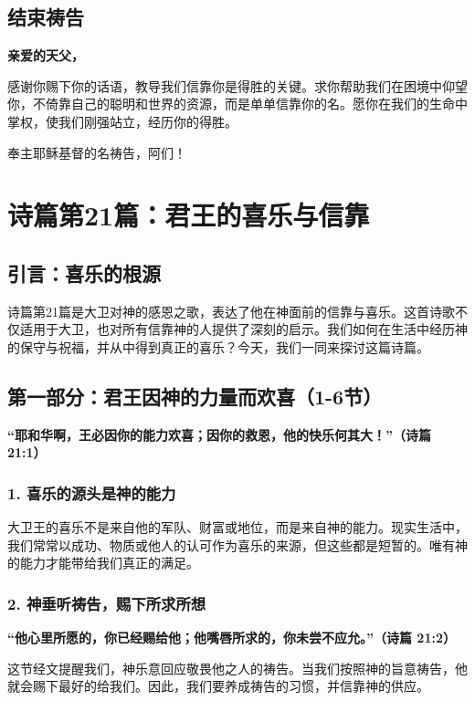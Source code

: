 \documentclass[a4paper, 12pt]{article}
\begin{document}
\subsection*{结束祷告}

\textbf{亲爱的天父，}

感谢你赐下你的话语，教导我们信靠你是得胜的关键。求你帮助我们在困境中仰望你，不倚靠自己的聪明和世界的资源，而是单单信靠你的名。愿你在我们的生命中掌权，使我们刚强站立，经历你的得胜。

奉主耶稣基督的名祷告，阿们！
\newpage
\section{诗篇第21篇：君王的喜乐与信靠}

\subsection*{引言：喜乐的根源}

诗篇第21篇是大卫对神的感恩之歌，表达了他在神面前的信靠与喜乐。这首诗歌不仅适用于大卫，也对所有信靠神的人提供了深刻的启示。我们如何在生活中经历神的保守与祝福，并从中得到真正的喜乐？今天，我们一同来探讨这篇诗篇。

\subsection*{第一部分：君王因神的力量而欢喜（1-6节）}

\textbf{“耶和华啊，王必因你的能力欢喜；因你的救恩，他的快乐何其大！”（诗篇 21:1）}

\subsubsection*{1. 喜乐的源头是神的能力}

大卫王的喜乐不是来自他的军队、财富或地位，而是来自神的能力。现实生活中，我们常常以成功、物质或他人的认可作为喜乐的来源，但这些都是短暂的。唯有神的能力才能带给我们真正的满足。

\subsubsection*{2. 神垂听祷告，赐下所求所想}

\textbf{“他心里所愿的，你已经赐给他；他嘴唇所求的，你未尝不应允。”（诗篇 21:2）}

这节经文提醒我们，神乐意回应敬畏他之人的祷告。当我们按照神的旨意祷告，他就会赐下最好的给我们。因此，我们要养成祷告的习惯，并信靠神的供应。
\end{document}
